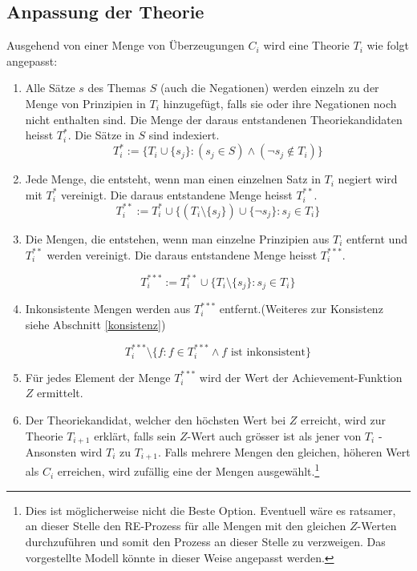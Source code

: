 \documentclass{article}
\begin{document}
\subsection{Anpassung der Theorie} \label{T-Anpassung}
Ausgehend von einer Menge von Überzeugungen $C_i$ wird eine Theorie $T_i$ wie folgt angepasst: 
\begin{enumerate}
    \item \label{1} Alle Sätze $s$ des Themas $S$ (auch die Negationen) werden einzeln zu der Menge von Prinzipien in $T_i$ hinzugefügt, falls sie oder ihre Negationen noch nicht enthalten sind. Die Menge der daraus entstandenen Theoriekandidaten heisst $T_i^*$. Die Sätze in $S$ sind indexiert.
    $$ 
        T_i^*:= \{ T_i \cup \{s_j\}: (s_j \in S) \land (\neg s_j \not\in T_i) \}
    $$
    \item \label{1.1} Jede Menge, die entsteht, wenn man einen einzelnen Satz in $T_i$ negiert wird mit $T_i^*$ vereinigt. Die daraus entstandene Menge heisst $T_i^{**}$.
    $$
        T_i^{**}:= T_i^* \cup \{ (T_i \setminus \{s_j\}) \cup \{\neg s_j\}: s_j \in T_i\}
    $$
    \item \label{2} Die Mengen, die entstehen, wenn man einzelne Prinzipien aus $T_i$ entfernt und $T_i^{**}$ werden vereinigt. Die daraus entstandene Menge heisst $T_i^{***}$.
    
    $$
        T_i^{***}:= T_i^{**} \cup \{ T_i \setminus \{s_j\}: s_j \in T_i\}
    $$
    
    \item \label{konsistenzfilter} Inkonsistente Mengen werden aus $T_i^{***}$ entfernt.(Weiteres zur Konsistenz siehe Abschnitt \ref{konsistenz})
    
    $$
        T_i^{***} \setminus \{f : f \in T_i^{***} \land f \text{ ist inkonsistent} \}
    $$
    \item \label{3} Für jedes Element der Menge $T_i^{***}$ wird der Wert der Achievement-Funktion $Z$ ermittelt.
    \item \label{4} Der Theoriekandidat, welcher den höchsten Wert bei $Z$ erreicht, wird zur Theorie $T_{i+1}$ erklärt, falls sein $Z$-Wert auch grösser ist als jener von $T_i$ - Ansonsten wird $T_i$ zu $T_{i+1}$. Falls mehrere Mengen den gleichen, höheren Wert als $C_i$ erreichen, wird zufällig eine der Mengen ausgewählt.\footnote{Dies ist möglicherweise nicht die Beste Option. Eventuell wäre es ratsamer, an dieser Stelle den RE-Prozess für alle Mengen mit den gleichen $Z$-Werten durchzuführen und somit den Prozess an dieser Stelle zu verzweigen. Das vorgestellte Modell könnte in dieser Weise angepasst werden.}
\end{enumerate}
\end{document}

